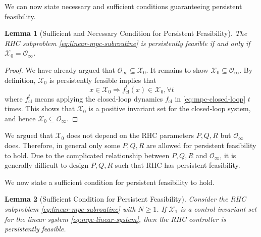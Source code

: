 \documentclass[
]{book}
\newtheorem{lemma}{Lemma}[chapter]
\theoremstyle{definition}
\theoremstyle{definition}
\theoremstyle{definition}
\theoremstyle{definition}
\theoremstyle{remark}
\begin{document}
We can now state necessary and sufficient conditions guaranteeing persistent feasibility.

\begin{lemma}[Sufficient and Necessary Condition for Persistent Feasibility]
\protect\hypertarget{lem:sufficient-necessary-feasibility}{}\label{lem:sufficient-necessary-feasibility}The RHC subproblem \eqref{eq:linear-mpc-subroutine} is persistently feasible if and only if \(\mathcal{X}_0 = \mathcal{O}_{\infty}\).
\end{lemma}

\begin{proof}
We have already argued that \(\mathcal{O}_{\infty} \subseteq \mathcal{X}_0\). It remains to show \(\mathcal{X}_0 \subseteq \mathcal{O}_{\infty}\). By definition, \(\mathcal{X}_0\) is persistently feasible implies that
\[
x \in \mathcal{X}_0 \Longrightarrow f_{\mathrm{cl}}^t(x) \in \mathcal{X}_0, \forall t
\]
where \(f_{\mathrm{cl}}^t\) means applying the closed-loop dynamics \(f_{\mathrm{cl}}\) in \eqref{eq:mpc-closed-loop} \(t\) times. This shows that \(\mathcal{X}_0\) is a positive invariant set for the closed-loop system, and hence \(\mathcal{X}_0 \subseteq \mathcal{O}_{\infty}\).
\end{proof}

We argued that \(\mathcal{X}_0\) does not depend on the RHC parameters \(P,Q,R\) but \(\mathcal{O}_{\infty}\) does. Therefore, in general only some \(P,Q,R\) are allowed for persistent feasibility to hold. Due to the complicated relationship between \(P,Q,R\) and \(\mathcal{O}_{\infty}\), it is generally difficult to design \(P,Q,R\) such that RHC has persistent feasibility.

We now state a sufficient condition for persistent feasibility to hold.

\begin{lemma}[Sufficient Condition for Persistent Feasibility]
\protect\hypertarget{lem:sufficient-feasibility}{}\label{lem:sufficient-feasibility}Consider the RHC subproblem \eqref{eq:linear-mpc-subroutine} with \(N \geq 1\). If \(\mathcal{X}_1\) is a control invariant set for the linear system \eqref{eq:mpc-linear-system}, then the RHC controller is persistently feasible.
\end{lemma}
\end{document}
